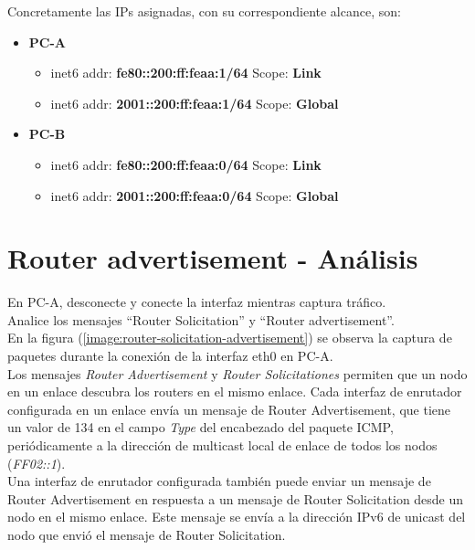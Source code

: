 \documentclass[osajnl,twocolumn,showpacs,superscriptaddress,10pt]{revtex4-1} %
\begin{document}
Concretamente las IPs asignadas, con su correspondiente alcance, son:

\begin{itemize}
    \item \textbf{PC-A}
    
    \begin{itemize}
        \item inet6 addr: \textbf{fe80::200:ff:feaa:1/64} Scope: \textbf{Link}
        \item inet6 addr: \textbf{2001::200:ff:feaa:1/64} Scope: \textbf{Global}
    \end{itemize}

    \item \textbf{PC-B}
    
    \begin{itemize}
        \item inet6 addr: \textbf{fe80::200:ff:feaa:0/64} Scope: \textbf{Link}
        \item inet6 addr: \textbf{2001::200:ff:feaa:0/64} Scope: \textbf{Global}
    \end{itemize}
\end{itemize}

\section{Router advertisement - Análisis}

En PC-A, desconecte y conecte la interfaz mientras captura tráfico. \\

Analice los mensajes “Router Solicitation” y “Router advertisement”. \\

En la figura (\ref{image:router-solicitation-advertisement}) se observa la captura de paquetes durante 
la conexión de la interfaz eth0 en PC-A. \\

Los mensajes \textit{Router Advertisement} y \textit{Router Solicitationes} permiten que un nodo en un enlace descubra los routers 
en el mismo enlace. Cada interfaz de enrutador configurada en un enlace envía un mensaje de Router Advertisement, 
que tiene un valor de 134 en el campo \textit{Type} del encabezado del paquete ICMP, periódicamente a la dirección 
de multicast local de enlace de todos los nodos (\textit{FF02::1}). \\

Una interfaz de enrutador configurada también puede enviar un mensaje de Router Advertisement en respuesta a un mensaje 
de Router Solicitation desde un nodo en el mismo enlace. Este mensaje se envía a la dirección IPv6 de unicast del nodo 
que envió el mensaje de Router Solicitation.
\end{document}
